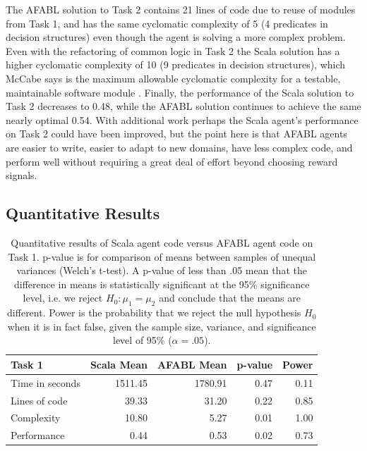 The AFABL solution to Task 2 contains 21 lines of code due to reuse of modules from Task 1, and has the same cyclomatic complexity of 5 (4 predicates in decision structures) even though the agent is solving a more complex problem. Even with the refactoring of common logic in Task 2 the Scala solution has a higher cyclomatic complexity of 10 (9 predicates in decision structures), which McCabe says is the maximum allowable cyclomatic complexity for a testable, maintainable software module \cite{mccabe1976complexity}. Finally, the performance of the Scala solution to Task 2 decreases to 0.48, while the AFABL solution continues to achieve the same nearly optimal 0.54. With additional work perhaps the Scala agent's performance on Task 2 could have been improved, but the point here is that AFABL agents are easier to write, easier to adapt to new domains, have less complex code, and perform well without requiring a great deal of effort beyond choosing reward signals.

\subsection{Quantitative Results}

\begin{center}
\begin{table}[h]
\begin{center}

\begin{tabular}{|l|r|r|r|r|}\hline
Task 1 & Scala Mean & AFABL Mean & p-value & Power \\\hline
Time in seconds & 1511.45 & 1780.91 & 0.47 & 0.11\\
Lines of code & 39.33 & 31.20 & 0.22 & 0.85\\
Complexity & 10.80 & 5.27 & 0.01 & 1.00\\
Performance & 0.44 & 0.53 & 0.02 & 0.73\\
\hline
\end{tabular}

\end{center}
\caption{Quantitative results of Scala agent code versus AFABL agent code on Task 1. p-value is for comparison of means between samples of unequal variances (Welch's t-test). A p-value of less than .05 mean that the difference in means is statistically significant at the 95\% significance level, i.e. we reject $H_0: \mu_1 = \mu_2$ and conclude that the means are different. Power is the probability that we reject the null hypothesis $H_0$ when it is in fact false, given the sample size, variance, and significance level of 95\% ($\alpha = .05$).}
\label{tbl:task1-results}
\end{table}
\end{center}

